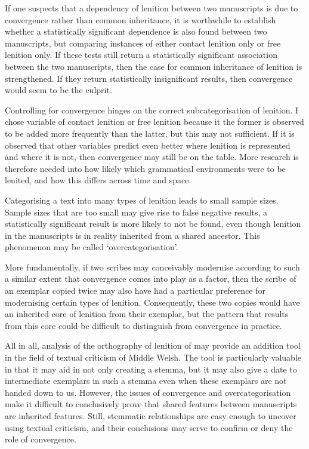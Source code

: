 If one suspects that a dependency of lenition between two manuscripts is due to convergence rather than common inheritance, it is worthwhile to establish whether a statistically significant dependence is also found between two manuscripts, but comparing instances of either contact lenition only or free lenition only. If these tests still return a statistically significant association between the two manuscripts, then the case for common inheritance of lenition is strengthened. If they return statistically insignificant results, then convergence would seem to be the culprit.

Controlling for convergence hinges on the correct subcategorisation of lenition. I chose variable of contact lenition or free lenition because it the former is observed to be added more frequently than the latter, but this may not sufficient. If it is observed that other variables predict even better where lenition is represented and where it is not, then convergence may still be on the table. More research is therefore needed into how likely which grammatical environments were to be lenited, and how this differs across time and space.



Categorising a text into many types of lenition leads to small sample sizes. Sample sizes that are too small may give rise to false negative results, \ie a statistically significant result is more likely to not be found, even though lenition in the manuscripts is in reality inherited from a shared ancestor. This phenomenon may be called `overcategorisation'.

More fundamentally, if two scribes may conceivably modernise according to such a similar extent that convergence comes into play as a factor, then the scribe of an exemplar copied twice may also have had a particular preference for modernising certain types of lenition. Consequently, these two copies would have an inherited core of lenition from their exemplar, but the pattern that results from this core could be difficult to distinguish from convergence in practice.

All in all, analysis of the orthography of lenition of  may provide an addition tool in the field of textual criticism of Middle Welsh. The tool is particularly valuable in that it may aid in not only creating a stemma, but it may also give a date to intermediate exemplars in such a stemma even when these exemplars are not handed down to us. However, the issues of convergence and overcategorisation make it difficult to conclusively prove that shared features between manuscripts are inherited features. Still, stemmatic relationships are easy enough to uncover using textual criticism, and their conclusions may serve to confirm or deny the role of convergence.

